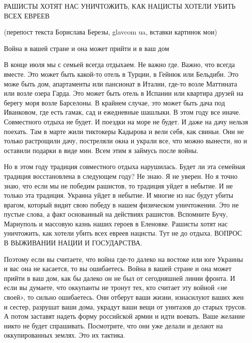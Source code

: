  
 
 
 
 

РАШИСТЫ ХОТЯТ НАС УНИЧТОЖИТЬ, КАК НАЦИСТЫ ХОТЕЛИ УБИТЬ ВСЕХ ЕВРЕЕВ

(перепост текста Борислава Березы, glavcom ua, вставки картинок мои)

Война в вашей стране и она может прийти и в ваш дом

В конце июля мы с семьей всегда отдыхаем. Не важно где. Важно, что всегда вместе. Это может быть какой-то отель в Турции, в Гейнюк или Бельдиби. Это може быть дом, апартаменты или пансионат в Италии, где-то возле Маттината или возле озера Гарда. Это может быть отель в Испании или квартира друзей на берегу моря возле Барселоны. В крайнем случае, это может быть дача под Иванковом, где есть гамак, сад и ежедневные шашлыки. В этом году все иначе. Совместного отдыха не будет. И поездки на море не будет. И даже на дачу нельзя поехать. Там в марте жили тиктокеры Кадырова и вели себя, как свиньи. Они не только растрощили дачу, постреляли окна и украли все, что можно вынести, но и оставили подарки в виде мин. Всем этим я займусь после войны.

Но в этом году традиция совместного отдыха нарушилась. Будет ли эта семейная традиция восстановлена в следующем году? Не знаю. Я не уверен. Но я точно знаю, что если мы не победим рашистов, то традиция уйдет в небытие. И не только эта традиция. Украина уйдет в небытие. И многие из нас будут убиты врагом, который видит свою победу в нашем физическом уничтожении. Это не пустые слова, а факт основанный на действиях рашистов. Вспомните Бучу, Мариуполь и массовую казнь наших героев в Еленовке. Рашисты хотят нас уничтожить, как хотели убить всех евреев нацисты. Тут не до отдыха. ВОПРОС В ВЫЖИВАНИИ НАЦИИ И ГОСУДАРСТВА.



Поэтому если вы считаете, что война где-то далеко на востоке или юге Украины и
вас она не касается, то вы ошибаетесь. Война в вашей стране и она может прийти
в ваш дом, как бы далеко он не был от сегодняшней линии фронта. И если вы
думаете, что оккупанты не тронут тех, кто считает эту войной «не своей», то
сильно ошибаетесь. Они отберут ваши жизни, изнасилуют ваших жен и сестер,
разрушат ваши дома, украдут ваши вещи от унитазов до старых трусов. А потом
заставят надеть форму российской армии и идти воевать. Ваше желание никто не
будет спрашивать. Посмотрите, что они уже делали и делают на оккупированных
землях. Это их тактика.

